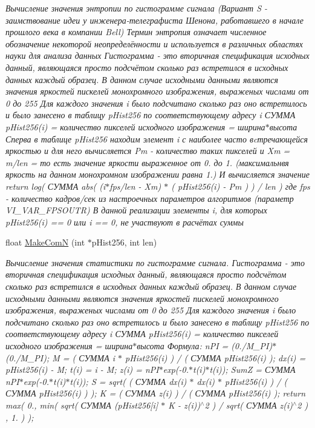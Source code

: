 \begin{DoxyCompactItemize}
\begin{DoxyCompactList}\small\item\em Вычисление значения энтропии по гистограмме сигнала (Вариант S -\/ заимствование идеи у инженера-\/телеграфиста Шенона, работавшего в начале прошлого века в компании Bell) Термин энтропия означает численное обозначение некоторой неопределённости и используется в различных областях науки для анализа данных Гистограмма -\/ это вторичная спецификация исходных данный, являющаяся просто подсчётом сколько раз встретился в исходных данных каждый образец. В данном случае исходными данными являются значения яркостей пискелей монохромного изображения, выраженых числами от 0 до 255 Для каждого значения i было подсчитано сколько раз оно встретилось и было занесено в таблицу p\+Hist256 по соответствующему адресу i СУММА p\+Hist256(i) = количество пикселей исходного изображения = ширина$\ast$высота Сперва в таблице p\+Hist256 находим элемент i с наиболее часто вcтречающейся яркостью и для него вычисляется Pm -\/ количество таких пикселей и Xm = m/len = то есть значение яркости выраженное от 0. до 1. (максимальнвя яркость на данном монохромном изображении равна 1.) И вычисляется значение return log( СУММА abs( (i$\ast$fps/len -\/ Xm) $\ast$ ( p\+Hist256(i) -\/ Pm ) ) / len ) где fps -\/ количество кадров/сек из настроечных параметров алгоритмов (параметр V\+I\+\_\+\+V\+A\+R\+\_\+\+F\+P\+S\+O\+U\+T\+R) В данной реализации элементы i, для которых p\+Hist256(i) == 0 или i == 0, не участвуют в расчётах суммы \end{DoxyCompactList}\item 
float \hyperlink{class_c_v_i_engine_base_a4bde6b4202b8dfa683becb522949e09c}{Make\+Com\+N} (int $\ast$p\+Hist256, int len)
\begin{DoxyCompactList}\small\item\em Вычисление значения статистики по гистограмме сигнала. Гистограмма -\/ это вторичная спецификация исходных данный, являющаяся просто подсчётом сколько раз встретился в исходных данных каждый образец. В данном случае исходными данными являются значения яркостей пискелей монохромного изображения, выраженых числами от 0 до 255 Для каждого значения i было подсчитано сколько раз оно встретилось и было занесено в таблицу p\+Hist256 по соответствующему адресу i СУММА p\+Hist256(i) = количество пикселей исходного изображения = ширина$\ast$высота Формула\+: n\+P\+I = (0./\+M\+\_\+\+P\+I)$\ast$(0./\+M\+\_\+\+P\+I); M = ( СУММА i $\ast$ p\+Hist256(i) ) / ( СУММА p\+Hist256(i) ); dx(i) = p\+Hist256(i) -\/ M; t(i) = i -\/ M; z(i) = n\+P\+I$\ast$exp(-\/0.$\ast$t(i)$\ast$t(i)); Sum\+Z = СУММА n\+P\+I$\ast$exp(-\/0.$\ast$t(i)$\ast$t(i)); S = sqrt( ( СУММА dx(i) $\ast$ dx(i) $\ast$ p\+Hist256(i) ) / ( СУММА p\+Hist256(i) ) ); K = ( СУММА z(i) ) / ( СУММА p\+Hist256(i) ); return max( 0., min( sqrt( СУММА (p\+Hist256\mbox{[}i\mbox{]} $\ast$ K -\/ z(i))$^\wedge$2 ) / sqrt( СУММА z(i)$^\wedge$2 ) , 1. ) ); \end{DoxyCompactList}\item 

\end{DoxyCompactItemize}
